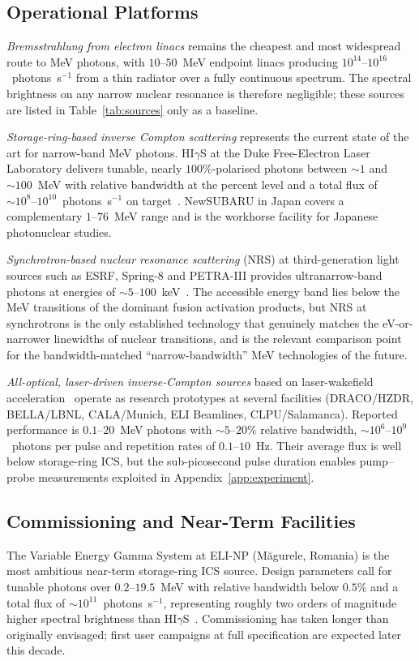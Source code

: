 \documentclass[conference]{IEEEtran}
\begin{document}
\subsection{Operational Platforms}
\emph{Bremsstrahlung from electron linacs} remains the cheapest and most widespread route to MeV photons, with $10\text{--}50$~MeV endpoint linacs producing $10^{14}\text{--}10^{16}$~photons~s$^{-1}$ from a thin radiator over a fully continuous spectrum. The spectral brightness on any narrow nuclear resonance is therefore negligible; these sources are listed in Table~\ref{tab:sources} only as a baseline.

\emph{Storage-ring-based inverse Compton scattering} represents the current state of the art for narrow-band MeV photons. HI$\gamma$S at the Duke Free-Electron Laser Laboratory delivers tunable, nearly $100\%$-polarised photons between $\sim 1$ and $\sim 100$~MeV with relative bandwidth at the percent level and a total flux of $\sim 10^{8}\text{--}10^{10}$~photons~s$^{-1}$ on target~\cite{weller2009higs}. NewSUBARU in Japan covers a complementary $1\text{--}76$~MeV range and is the workhorse facility for Japanese photonuclear studies.

\emph{Synchrotron-based nuclear resonance scattering} (NRS) at third-generation light sources such as ESRF, Spring-8 and PETRA-III provides ultranarrow-band photons at energies of $\sim 5\text{--}100$~keV~\cite{chumakov2018narrow}. The accessible energy band lies below the MeV transitions of the dominant fusion activation products, but NRS at synchrotrons is the only established technology that genuinely matches the eV-or-narrower linewidths of nuclear transitions, and is the relevant comparison point for the bandwidth-matched ``narrow-bandwidth'' MeV technologies of the future.

\emph{All-optical, laser-driven inverse-Compton sources} based on laser-wakefield acceleration~\cite{esarey2009lwfa,powers2014allopticalics} operate as research prototypes at several facilities (DRACO/HZDR, BELLA/LBNL, CALA/Munich, ELI Beamlines, CLPU/Salamanca). Reported performance is $0.1\text{--}20$~MeV photons with $\sim 5\text{--}20\%$ relative bandwidth, $\sim 10^{6}\text{--}10^{9}$~photons per pulse and repetition rates of $0.1\text{--}10$~Hz. Their average flux is well below storage-ring ICS, but the sub-picosecond pulse duration enables pump--probe measurements exploited in Appendix~\ref{app:experiment}.

\subsection{Commissioning and Near-Term Facilities}
The Variable Energy Gamma System at ELI-NP (M\u{a}gurele, Romania) is the most ambitious near-term storage-ring ICS source. Design parameters call for tunable photons over $0.2\text{--}19.5$~MeV with relative bandwidth below $0.5\%$ and a total flux of $\sim 10^{11}$~photons~s$^{-1}$, representing roughly two orders of magnitude higher spectral brightness than HI$\gamma$S~\cite{balabanski2018elinp}. Commissioning has taken longer than originally envisaged; first user campaigns at full specification are expected later this decade.
\end{document}
